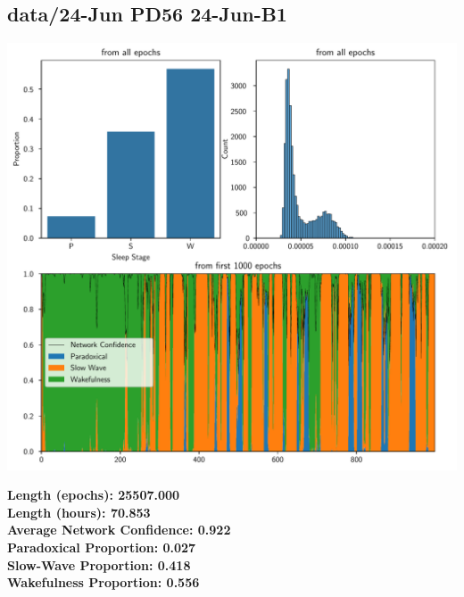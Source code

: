         \subsection*{ data/24-Jun PD56 24-Jun-B1 }
        \begin{center}
        \begin{adjustbox}{width=1\textwidth}
        \includegraphics[page=17]{figs.pdf}
        \end{adjustbox}
        \end{center}
        \large\textbf{Length (epochs): 25507.000}\\
        \textbf{Length (hours): 70.853}\\
        \textbf{Average Network Confidence: 0.922}\\
        \textbf{Paradoxical Proportion: 0.027}\\
        \textbf{Slow-Wave Proportion: 0.418}\\
        \textbf{Wakefulness Proportion: 0.556}\\
        
